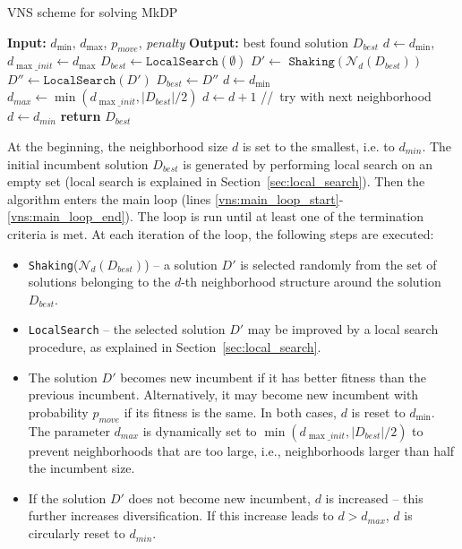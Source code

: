 \documentclass[dvipsnames,format=sigconf]{acmart} %
\begin{document}
     \begin{algorithm}[!t] 
  	\caption{VNS scheme for solving MkDP}\label{alg:vns}
  	\begin{algorithmic}[1]
  		\STATE \textbf{Input:} $d_{\min}$, $d_{\max}$, $p_{move}$, \emph{penalty}
  		\STATE \textbf{Output:} best found solution $D_{best}$
  		\STATE $d \gets  d_{\min}$, $d_{\max\_init} \gets d_{\max}$
  		\STATE  $D_{best} \gets \texttt{LocalSearch}(\emptyset)$ \label{vns:init}
  		  \label{vns:main_loop_start}
  		\STATE  $D' \gets$  $\texttt{Shaking}(\mathcal{N}_d(D_{best}))$
  		\STATE $D'' \gets  \texttt{LocalSearch}(D')$
  		 \label{line:acceptance_incumbent_cond}
  	    \STATE $D _{best}\gets D''$
  	    \STATE $d \gets d_{\min}$
  	 	\STATE  $d_{max} \gets \min(d_{\max\_init}, |D_{best}|/2)$  \label{vns:implicit_bound}
  		\ELSE 
  		\STATE $d \gets d + 1$ \hspace{0.3cm}//\, try with next neighborhood
  		\STATE $d\gets d_{min}$
  		\ENDIF
  		\ENDIF
  		\ENDWHILE \label{vns:main_loop_end}
  		\STATE \textbf{return} $D_{best}$
  	\end{algorithmic}
  \end{algorithm}

  At the beginning, the neighborhood size $d$ is set to the smallest, i.e. to $d_{min}$. 
  The initial incumbent solution $D_{best}$ is generated by performing local search on an empty set (local search is explained in Section~\ref{sec:local_search}).  
  Then the algorithm enters the main loop (lines \ref{vns:main_loop_start}-\ref{vns:main_loop_end}). The loop is run until at least one of the termination criteria is met. At each iteration of the loop, the following steps are executed: 
  
  \begin{itemize}
  	\item \texttt{Shaking}($\mathcal{N}_d(D_{best})$) -- a solution $D'$ is selected   randomly from the set of solutions belonging to the $d$-th neighborhood structure around the solution $D_{best}$.
  	\item  \texttt{LocalSearch} -- the selected solution $D'$ may be improved by a local search procedure, as explained in Section~\ref{sec:local_search}.
  	\item The solution $D'$ becomes new incumbent if it has better fitness than the previous incumbent. Alternatively, it may become new incumbent with probability $p_{move}$ if its fitness is the same. In both cases, $d$ is reset to $d_{\min}$. The parameter $d_{max}$ is dynamically set to $\min(d_{\max\_init}, |D_{best}|/2)$ to prevent neighborhoods that are too large, i.e., neighborhoods larger than half  the incumbent size. 
  	\item  If the solution $D'$ does not become new incumbent, $d$ is increased -- this further increases diversification. If this increase leads to $d> d_{max}$, $d$ is circularly reset to $d_{min}$.
   \end{itemize}
    
\end{document}

